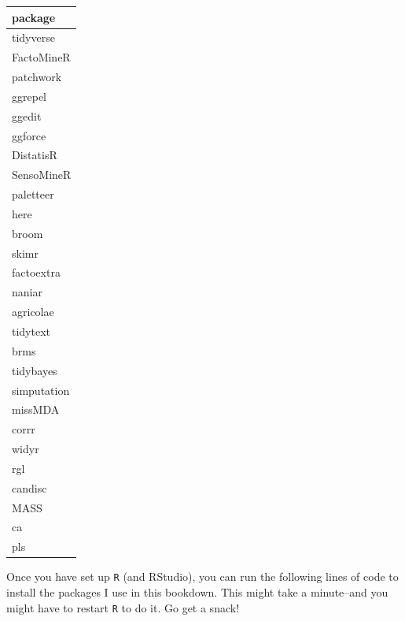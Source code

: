 \documentclass[
]{book}
\begin{document}
\begin{tabular}{l}
\hline
package\\
\hline
tidyverse\\
\hline
FactoMineR\\
\hline
patchwork\\
\hline
ggrepel\\
\hline
ggedit\\
\hline
ggforce\\
\hline
DistatisR\\
\hline
SensoMineR\\
\hline
paletteer\\
\hline
here\\
\hline
broom\\
\hline
skimr\\
\hline
factoextra\\
\hline
naniar\\
\hline
agricolae\\
\hline
tidytext\\
\hline
brms\\
\hline
tidybayes\\
\hline
simputation\\
\hline
missMDA\\
\hline
corrr\\
\hline
widyr\\
\hline
rgl\\
\hline
candisc\\
\hline
MASS\\
\hline
ca\\
\hline
pls\\
\hline
\end{tabular}

Once you have set up \texttt{R} (and RStudio), you can run the following lines of code to install the packages I use in this bookdown. This might take a minute--and you might have to restart \texttt{R} to do it. Go get a snack!
\end{document}

